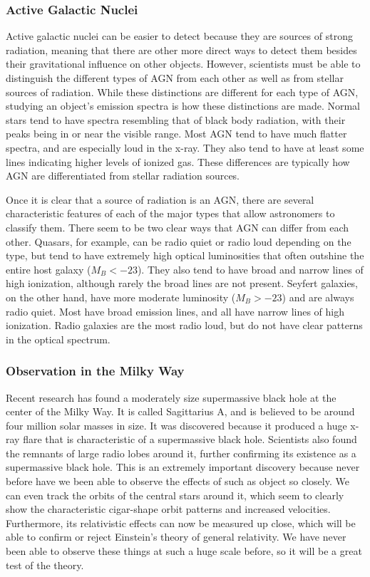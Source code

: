 \documentclass[12pt]{article}
\begin{document}
    \subsubsection{Active Galactic Nuclei}
    Active galactic nuclei can be easier to detect because they are sources of
    strong radiation, meaning that there are other more direct ways to detect
    them besides their gravitational influence on other objects.  However,
    scientists must be able to distinguish the different types of AGN from each
    other as well as from stellar sources of radiation.  While these
    distinctions are different for each type of AGN, studying an object's
    emission spectra is how these distinctions are made.  Normal stars tend to
    have spectra resembling that of black body radiation, with their peaks being
    in or near the visible range.  Most AGN tend to have much flatter spectra,
    and are especially loud in the x-ray.  They also tend to have at least some
    lines indicating higher levels of ionized gas.  These differences are
    typically how AGN are differentiated from stellar radiation sources.

    Once it is clear that a source of radiation is an AGN, there are several
    characteristic features of each of the major types that allow astronomers to
    classify them.  There seem to be two clear ways that AGN can differ from
    each other.  Quasars, for example, can be radio quiet or radio loud
    depending on the type, but tend to have extremely high optical luminosities
    that often outshine the entire host galaxy ($M_B < -23$).  They also tend to
    have broad and narrow lines of high ionization, although rarely the broad
    lines are not present.  Seyfert galaxies, on the other hand, have more
    moderate luminosity ($M_B > -23$) and are always radio quiet.  Most have
    broad emission lines, and all have narrow lines of high ionization.  Radio
    galaxies are the most radio loud, but do not have clear patterns in the
    optical spectrum.

    \subsubsection{Observation in the Milky Way}
    Recent research has found a moderately size supermassive black hole at the
    center of the Milky Way.  It is called Sagittarius A, and is believed to be
    around four million solar masses in size.  It was discovered because it
    produced a huge x-ray flare that is characteristic of a supermassive black
    hole.  Scientists also found the remnants of large radio lobes around it,
    further confirming its existence as a supermassive black hole.  This is an
    extremely important discovery because never before have we been able to
    observe the effects of such as object so closely.  We can even track the
    orbits of the central stars around it, which seem to clearly show the
    characteristic cigar-shape orbit patterns and increased velocities.
    Furthermore, its relativistic effects can now be measured up close, which
    will be able to confirm or reject Einstein's theory of general relativity.
    We have never been able to observe these things at such a huge scale before,
    so it will be a great test of the theory.
\end{document}
